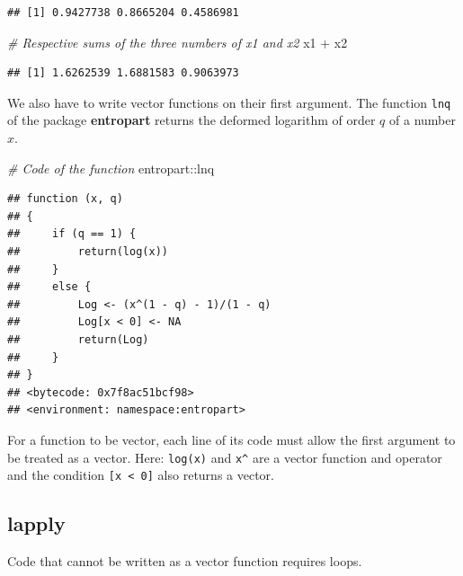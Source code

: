 \documentclass[
  12pt,
  american,
  a4paper,
  extrafontsizes,onecolumn,openright
  ]{memoir}
\newenvironment{Shaded}{\begin{snugshade}}{\end{snugshade}}
\newcommand{\CommentTok}[1]{\textcolor[rgb]{0.56,0.35,0.01}{\textit{#1}}}
\newcommand{\NormalTok}[1]{#1}
\newcommand{\SpecialCharTok}[1]{\textcolor[rgb]{0.00,0.00,0.00}{#1}}
\begin{document}
\begin{verbatim}
## [1] 0.9427738 0.8665204 0.4586981
\end{verbatim}

\begin{Shaded}
\begin{Highlighting}[]
\CommentTok{\# Respective sums of the three numbers of x1 and x2}
\NormalTok{x1 }\SpecialCharTok{+}\NormalTok{ x2}
\end{Highlighting}
\end{Shaded}

\begin{verbatim}
## [1] 1.6262539 1.6881583 0.9063973
\end{verbatim}

\normalsize

We also have to write vector functions on their first argument.
The function \texttt{lnq} of the package \textbf{entropart} returns the deformed logarithm of order \(q\) of a number \(x\).

\scriptsize

\begin{Shaded}
\begin{Highlighting}[]
\CommentTok{\# Code of the function}
\NormalTok{entropart}\SpecialCharTok{::}\NormalTok{lnq}
\end{Highlighting}
\end{Shaded}

\begin{verbatim}
## function (x, q) 
## {
##     if (q == 1) {
##         return(log(x))
##     }
##     else {
##         Log <- (x^(1 - q) - 1)/(1 - q)
##         Log[x < 0] <- NA
##         return(Log)
##     }
## }
## <bytecode: 0x7f8ac51bcf98>
## <environment: namespace:entropart>
\end{verbatim}

\normalsize

For a function to be vector, each line of its code must allow the first argument to be treated as a vector.
Here: \texttt{log(x)} and \texttt{x\^{}} are a vector function and operator and the condition \texttt{{[}x\ \textless{}\ 0{]}} also returns a vector.

\hypertarget{lapply}{%
\subsection{lapply}\label{lapply}}

Code that cannot be written as a vector function requires loops.
\end{document}
